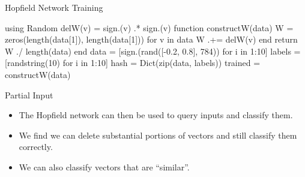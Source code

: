 \documentclass[
  ignorenonframetext,
]{beamer}
\newenvironment{Shaded}{\begin{snugshade}}{\end{snugshade}}
\newcommand{\BuiltInTok}[1]{\textcolor[rgb]{0.00,0.23,0.31}{#1}}
\newcommand{\CharTok}[1]{\textcolor[rgb]{0.13,0.47,0.30}{#1}}
\newcommand{\ControlFlowTok}[1]{\textcolor[rgb]{0.00,0.23,0.31}{#1}}
\newcommand{\FloatTok}[1]{\textcolor[rgb]{0.68,0.00,0.00}{#1}}
\newcommand{\FunctionTok}[1]{\textcolor[rgb]{0.28,0.35,0.67}{#1}}
\newcommand{\ImportTok}[1]{\textcolor[rgb]{0.00,0.46,0.62}{#1}}
\newcommand{\KeywordTok}[1]{\textcolor[rgb]{0.00,0.23,0.31}{#1}}
\newcommand{\NormalTok}[1]{\textcolor[rgb]{0.00,0.23,0.31}{#1}}
\newcommand{\OperatorTok}[1]{\textcolor[rgb]{0.37,0.37,0.37}{#1}}
\begin{document}
\begin{frame}[fragile]{Hopfield Network Training}
\protect\hypertarget{hopfield-network-training}{}
\begin{Shaded}
\begin{Highlighting}[numbers=left,,]
\ImportTok{using} \BuiltInTok{Random}
\FunctionTok{delW}\NormalTok{(v) }\OperatorTok{=} \FunctionTok{sign}\NormalTok{.(v) }\OperatorTok{.*} \FunctionTok{sign}\NormalTok{.(v)}\CharTok{\textquotesingle{}}
\KeywordTok{function} \FunctionTok{constructW}\NormalTok{(data)}
\NormalTok{    W }\OperatorTok{=} \FunctionTok{zeros}\NormalTok{(}\FunctionTok{length}\NormalTok{(data[}\FloatTok{1}\NormalTok{]), }\FunctionTok{length}\NormalTok{(data[}\FloatTok{1}\NormalTok{]))}
    \ControlFlowTok{for}\NormalTok{ v }\KeywordTok{in}\NormalTok{ data}
\NormalTok{        W }\OperatorTok{.+=} \FunctionTok{delW}\NormalTok{(v)}
    \ControlFlowTok{end}
    \ControlFlowTok{return}\NormalTok{ W }\OperatorTok{./} \FunctionTok{length}\NormalTok{(data)}
\KeywordTok{end}
\NormalTok{data }\OperatorTok{=}\NormalTok{ [}\FunctionTok{sign}\NormalTok{.(}\FunctionTok{rand}\NormalTok{([}\OperatorTok{{-}}\FloatTok{0.2}\NormalTok{, }\FloatTok{0.8}\NormalTok{], }\FloatTok{784}\NormalTok{)) for i }\KeywordTok{in} \FloatTok{1}\OperatorTok{:}\FloatTok{10}\NormalTok{]}
\NormalTok{labels }\OperatorTok{=}\NormalTok{ [}\FunctionTok{randstring}\NormalTok{(}\FloatTok{10}\NormalTok{) for i }\KeywordTok{in} \FloatTok{1}\OperatorTok{:}\FloatTok{10}\NormalTok{]}
\NormalTok{hash }\OperatorTok{=} \FunctionTok{Dict}\NormalTok{(}\FunctionTok{zip}\NormalTok{(data, labels))}
\NormalTok{trained }\OperatorTok{=} \FunctionTok{constructW}\NormalTok{(data)}
\end{Highlighting}
\end{Shaded}
\end{frame}

\begin{frame}{Partial Input}
\protect\hypertarget{partial-input}{}
\begin{itemize}
\item
  The Hopfield network can then be used to query inputs and classify
  them.
\item
  We find we can delete substantial portions of vectors and still
  classify them correctly.
\item
  We can also classify vectors that are ``similar''.
\end{itemize}
\end{frame}
\end{document}
